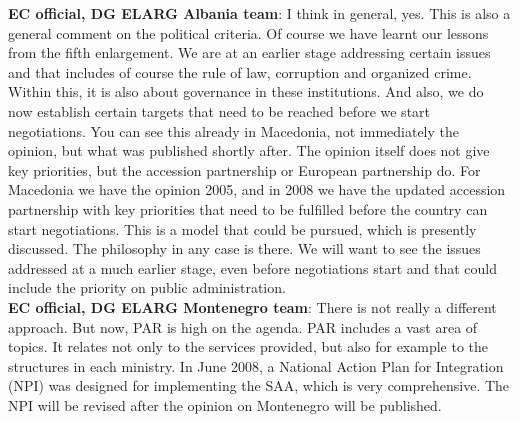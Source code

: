 \textbf{EC official, DG ELARG Albania team}: I think in general, yes. This is also a general comment on the political criteria. Of course we have learnt our lessons from the fifth enlargement. We are at an earlier stage addressing certain issues and that includes of course the rule of law, corruption and organized crime. Within this, it is also about governance in these institutions. And also, we do now establish certain targets that need to be reached before we start negotiations. You can see this already in Macedonia, not immediately the opinion, but what was published shortly after. The opinion itself does not give key priorities, but the accession partnership or European partnership do. For Macedonia we have the opinion 2005, and in 2008 we have the updated accession partnership with key priorities that need to be fulfilled before the country can start negotiations. This is a model that could be pursued, which is presently discussed. The philosophy in any case is there. We will want to see the issues addressed at a much earlier stage, even before negotiations start and that could include the priority on public administration.\\
\textbf{EC official, DG ELARG Montenegro team}: There is not really a different approach. But now, PAR is high on the agenda. PAR includes a vast area of topics. It relates not only to the services provided, but also for example to the structures in each ministry. In June 2008, a National Action Plan for Integration (NPI) was designed for implementing the SAA, which is very comprehensive. The NPI will be revised after the opinion on Montenegro will be published. \\
